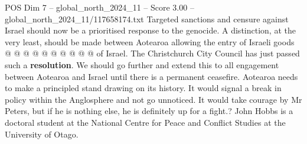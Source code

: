 \begin{textsample}{POS Dim 7 – global\_north\_2024\_11 – Score 3.00 – global\_north\_2024\_11/117658174.txt}
Targeted sanctions and censure against Israel should now be a prioritised response to the genocide.
A distinction, at the very least, should be made between Aotearoa allowing the entry of Israeli goods @ @ @ @ @ @ @ @ @ @ of Israel.
The Christchurch City Council has just passed such a \textbf{resolution}.
We should go further and extend this to all engagement between Aotearoa and Israel until there is a permanent ceasefire.
Aotearoa needs to make a principled stand drawing on its history.
It would signal a break in policy within the Anglosphere and not go unnoticed.
It would take courage by Mr Peters, but if he is nothing else, he is definitely up for a fight.?
John Hobbs is a doctoral student at the National Centre for Peace and Conflict Studies at the University of Otago.

\end{textsample}
